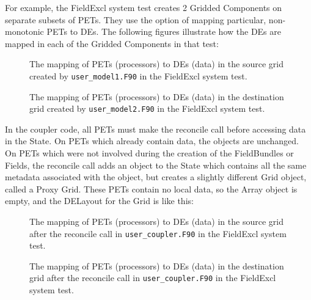 \begin{enumerate}
For example, the FieldExcl system test creates 2 Gridded Components
on separate subsets of PETs.  They use the option of mapping
particular, non-monotonic PETs to DEs.  The following figures 
illustrate how the DEs are mapped in each of the Gridded Components
in that test:

\begin{center}
\begin{figure}
\caption{The mapping of PETs (processors) to DEs (data)
in the source grid created by {\tt user\_model1.F90}
in the FieldExcl system test.}
\label{fig:excl_source}
\end{figure}
\end{center}

\begin{center}
\begin{figure}
\caption{The mapping of PETs (processors) to DEs (data)
in the destination grid created by {\tt user\_model2.F90}
in the FieldExcl system test.}
\label{fig:excl_destination}
\end{figure}
\end{center}

In the coupler code, all PETs must make the reconcile call before
accessing data in the State.  On PETs which already contain data,
the objects are unchanged.  On PETs which were not involved during
the creation of the FieldBundles or Fields, the reconcile call adds an
object to the State which contains all the same metadata associated
with the object, but creates a slightly different Grid object,
called a Proxy Grid. These PETs contain no local data, so the
Array object is empty, and the DELayout for the Grid is like this:

\begin{center}
\begin{figure}
\caption{The mapping of PETs (processors) to DEs (data)
in the source grid after the reconcile call in {\tt user\_coupler.F90}
in the FieldExcl system test.}
\label{fig:excl_source_cpl}
\end{figure}
\end{center}

\begin{center}
\begin{figure}
\caption{The mapping of PETs (processors) to DEs (data)
in the destination grid after the reconcile call in {\tt user\_coupler.F90}
in the FieldExcl system test.}
\label{fig:excl_destination_cpl}
\end{figure}
\end{center}

\end{enumerate}
